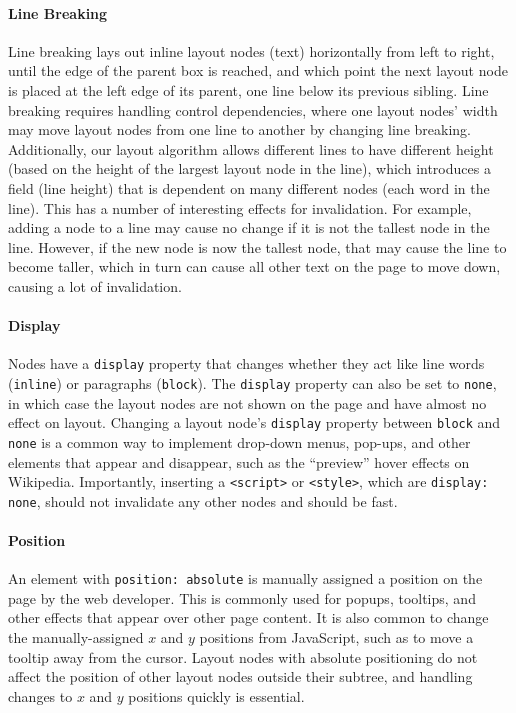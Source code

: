 \paragraph{Line Breaking}
Line breaking lays out inline layout nodes (text)
  horizontally from left to right,
  until the edge of the parent box is reached,
  and which point the next layout node is placed
  at the left edge of its parent,
  one line below its previous sibling.
Line breaking requires handling control dependencies,
  where one layout nodes' width may move layout nodes
  from one line to another by changing line breaking.
Additionally, our layout algorithm
  allows different lines to have different height
  (based on the height of the largest layout node in the line),
  which introduces a field (line height)
  that is dependent on many different nodes (each word in the line).
This has a number of interesting effects for invalidation.
For example, adding a node to a line
  may cause no change if it is not the tallest node in the line.
However, if the new node is now the tallest node,
  that may cause the line to become taller,
  which in turn can cause all other text on the page to move down,
  causing a lot of invalidation.

\paragraph{Display}
Nodes have a \texttt{display} property that changes
  whether they act like line words (\texttt{inline})
  or paragraphs (\texttt{block}).
The \texttt{display} property can also be set to \texttt{none},
  in which case the layout nodes are not shown on the page
  and have almost no effect on layout.
Changing a layout node's \texttt{display} property
  between \texttt{block} and \texttt{none}
  is a common way to implement drop-down menus,
  pop-ups, and other elements that appear and disappear,
  such as the ``preview'' hover effects on Wikipedia.
Importantly,
  inserting a \texttt{<script>} or \texttt{<style>},
  which are \texttt{display: none},
  should not invalidate any other nodes and should be fast.
  
\paragraph{Position}
An element with \texttt{position: absolute}
  is manually assigned a position on the page
  by the web developer.
This is commonly used for popups, tooltips, and other effects
  that appear over other page content.
It is also common
  to change the manually-assigned $x$ and $y$ positions
  from JavaScript, such as to move a tooltip away from the cursor.
Layout nodes with absolute positioning do not affect
  the position of other layout nodes outside their subtree,
  and handling changes to $x$ and $y$ positions quickly
  is essential.

